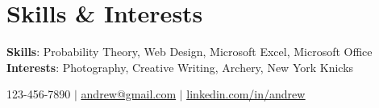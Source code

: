 \documentclass[letterpaper,11pt]{article}
\begin{document}
\section{Skills \& Interests}
\begin{itemize}[leftmargin=0.15in, label={}]
	\small{\item{
	      \vspace{1mm}
	      \textbf{Skills}{: Probability Theory, Web Design, Microsoft Excel, Microsoft Office} \\
	      \vspace{1mm}
	      \textbf{Interests}{: Photography, Creative Writing, Archery, New York Knicks} \\
	      \vspace{1mm}

	      }}
\end{itemize}
\begin{center}

	\small 123-456-7890 $|$
	\href{mailto:ADD EMAIL HERE@x.com}{\underline{andrew@gmail.com}} $|$
	\href{ADD LINKEDIN PAGE HERE}{\underline{linkedin.com/in/andrew}}
\end{center}
\end{document}
